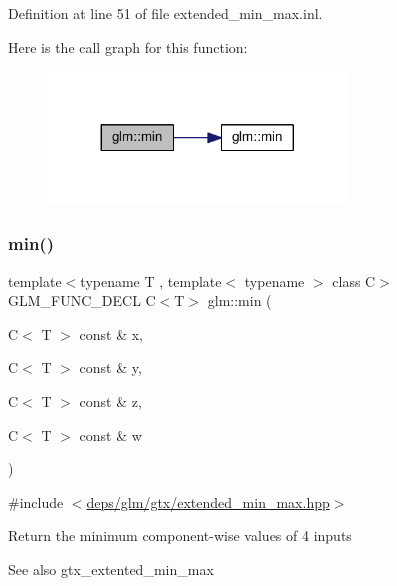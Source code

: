 Definition at line 51 of file extended\+\_\+min\+\_\+max.\+inl.

Here is the call graph for this function\+:
\nopagebreak
\begin{figure}[H]
\begin{center}
\leavevmode
\includegraphics[width=224pt]{df/d72/group__gtx__extended__min__max_ga4fe35dd31dd0c45693c9b60b830b8d47_cgraph}
\end{center}
\end{figure}
\mbox{\label{group__gtx__extended__min__max_ga7471ea4159eed8dd9ea4ac5d46c2fead}} 
\subsubsection{\texorpdfstring{min()}{min()}\hspace{0.1cm}{\footnotesize\ttfamily [6/6]}}
{\footnotesize\ttfamily template$<$typename T , template$<$ typename $>$ class C$>$ \\
G\+L\+M\+\_\+\+F\+U\+N\+C\+\_\+\+D\+E\+CL C$<$T$>$ glm\+::min (\begin{DoxyParamCaption}\item[{C$<$ T $>$ const \&}]{x,  }\item[{C$<$ T $>$ const \&}]{y,  }\item[{C$<$ T $>$ const \&}]{z,  }\item[{C$<$ T $>$ const \&}]{w }\end{DoxyParamCaption})}



{\ttfamily \#include $<$\hyperlink{extended__min__max_8hpp}{deps/glm/gtx/extended\+\_\+min\+\_\+max.\+hpp}$>$}

Return the minimum component-\/wise values of 4 inputs \begin{DoxySeeAlso}{See also}
gtx\+\_\+extented\+\_\+min\+\_\+max 
\end{DoxySeeAlso}


